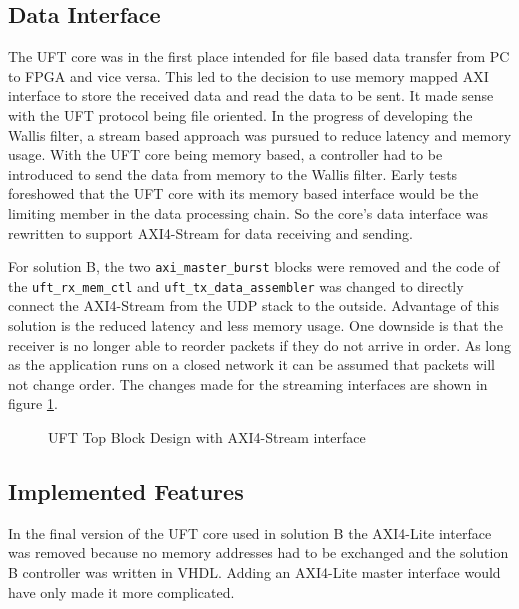 \subsection{Data Interface} \label{ch:data:com:datainterface}
The UFT core was in the first place intended for file based data transfer from
PC to FPGA and vice versa. This led to the decision to use memory mapped AXI
interface to store the received data and read the data to be sent. It made
sense with the UFT protocol being file oriented. In the progress of developing
the Wallis filter, a stream based approach was pursued to reduce latency and
memory usage. With the UFT core being memory based, a controller had to be
introduced to send the data from memory to the Wallis filter. Early tests
foreshowed that the UFT core with its memory based interface would be the
limiting member in the data processing chain. So the core's data interface was
rewritten to support AXI4-Stream for data receiving and sending.

For solution B, the two \texttt{axi\_master\_burst} blocks were removed and the
code of the \texttt{uft\_rx\_mem\_ctl} and \texttt{uft\_tx\_data\_assembler} was 
changed to directly connect the AXI4-Stream from the UDP stack to the outside.
Advantage of this solution is the reduced latency and less memory usage. One
downside is that the receiver is no longer able to reorder packets if they do
not arrive in order. As long as the application runs on a closed network it can
be assumed that packets will not change order. The changes made for the
streaming interfaces are shown in figure \ref{fig:ufttopstream}.

\begin{figure}[b!]
    \centering
    \begin{adjustbox}{max width=\textwidth}
        
    \end{adjustbox}
    \caption{UFT Top Block Design with AXI4-Stream interface}
    \label{fig:ufttopstream}
\end{figure}

\clearpage
\subsection{Implemented Features}
In the final version of the UFT core used in solution B the AXI4-Lite interface
was removed because no memory addresses had to be exchanged and the solution B
controller was written in VHDL. Adding an AXI4-Lite master interface would have
only made it more complicated. 
\\


